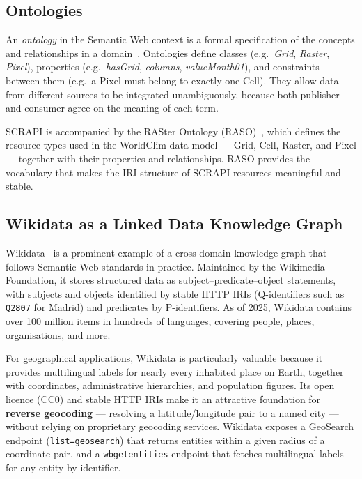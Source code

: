 \subsection{Ontologies}\label{REL_SEMWEB_ONTOLOGIES}

An \emph{ontology} in the Semantic Web context is a formal specification of the
concepts and relationships in a domain~\cite{owl2}. Ontologies define classes
(e.g.\ \emph{Grid}, \emph{Raster}, \emph{Pixel}), properties (e.g.\
\emph{hasGrid}, \emph{columns}, \emph{valueMonth01}), and constraints between
them (e.g.\ a Pixel must belong to exactly one Cell). They allow data from
different sources to be integrated unambiguously, because both publisher and
consumer agree on the meaning of each term.

SCRAPI is accompanied by the RASter Ontology (RASO)~\cite{raso}, which defines
the resource types used in the WorldClim data model --- Grid, Cell, Raster, and
Pixel --- together with their properties and relationships. RASO provides the
vocabulary that makes the IRI structure of SCRAPI resources meaningful and
stable.

\subsection{Wikidata as a Linked Data Knowledge Graph}\label{REL_SEMWEB_WIKIDATA}

Wikidata~\cite{wikidata} is a prominent example of a cross-domain knowledge
graph that follows Semantic Web standards in practice. Maintained by the
Wikimedia Foundation, it stores structured data as subject--predicate--object
statements, with subjects and objects identified by stable HTTP IRIs
(Q-identifiers such as \texttt{Q2807} for Madrid) and predicates by
P-identifiers. As of 2025, Wikidata contains over 100 million items in hundreds
of languages, covering people, places, organisations, and more.

For geographical applications, Wikidata is particularly valuable because it
provides multilingual labels for nearly every inhabited place on Earth, together
with coordinates, administrative hierarchies, and population figures. Its open
licence (CC0) and stable HTTP IRIs make it an attractive foundation for
\textbf{reverse geocoding} --- resolving a latitude/longitude pair to a named
city --- without relying on proprietary geocoding services. Wikidata exposes a
GeoSearch endpoint (\texttt{list=geosearch}) that returns entities within a
given radius of a coordinate pair, and a \texttt{wbgetentities} endpoint that
fetches multilingual labels for any entity by identifier.


